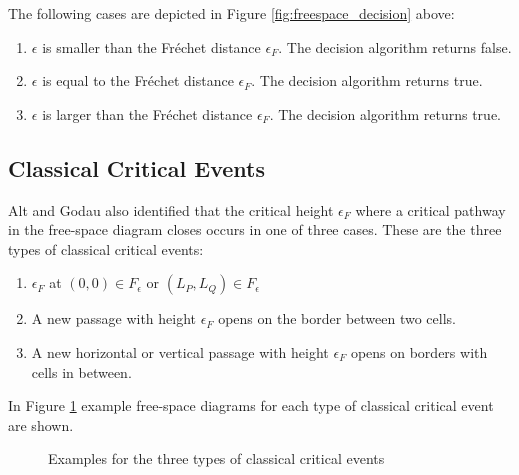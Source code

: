
The following cases are depicted in Figure \ref{fig:freespace_decision} above:
\begin{enumerate}[label=(\alph*)]
	\item $\epsilon$ is smaller than the Fréchet distance $\epsilon_F$. The decision algorithm returns false.
	\item $\epsilon$ is equal to the Fréchet distance $\epsilon_F$. The decision algorithm returns true.
	\item $\epsilon$ is larger than the Fréchet distance $\epsilon_F$. The decision algorithm returns true.
\end{enumerate}


\subsection{Classical Critical Events}

Alt and Godau also identified that the critical height $\epsilon_F$ where a critical pathway in the free-space diagram closes occurs in one of three cases. These are the three types of classical critical events:

\begin{enumerate}[label=(\alph*)]
	\item $\epsilon_F$ at $(0, 0) \in F_\epsilon$ or $(L_P, L_Q) \in F_\epsilon$
	\item A new passage with height $\epsilon_F$ opens on the border between two cells.
	\item A new horizontal or vertical passage with height $\epsilon_F$ opens on borders with cells in between.
\end{enumerate}

In Figure \ref{fig:classical_critical_events} example free-space diagrams for each type of classical critical event are shown.

\begin{figure}[H]
    \centering
    
    \qquad
    \qquad

	\caption{Examples for the three types of classical critical events}
    \label{fig:classical_critical_events}
\end{figure}

